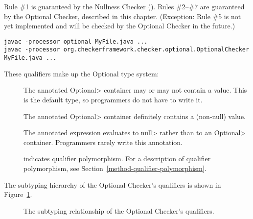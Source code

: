 Rule \#1 is guaranteed by the Nullness Checker
().
Rules \#2--\#7 are guaranteed by the Optional Checker, described in this chapter.
(Exception:  Rule \#5 is not yet implemented and will be checked by the
Optional Checker in the future.)



\begin{Verbatim}
javac -processor optional MyFile.java ...
javac -processor org.checkerframework.checker.optional.OptionalChecker MyFile.java ...
\end{Verbatim}



These qualifiers make up the Optional type system:

\begin{description}

\item[]
  The annotated \<Optional> container may or may not contain a value.
  This is the default type, so programmers do not have to write it.

\item[]
  The annotated \<Optional> container definitely contains a (non-null) value.

\item[]
  The annotated expression evaluates to \<null> rather than to an \<Optional> container.
  Programmers rarely write this annotation.

\item[]
  indicates qualifier polymorphism.
  For a description of qualifier polymorphism, see
  Section~\ref{method-qualifier-polymorphism}.

\end{description}

The subtyping hierarchy of the Optional Checker's qualifiers is shown in
Figure~\ref{fig-optional-hierarchy}.

\begin{figure}
\caption{The subtyping relationship of the Optional Checker's qualifiers.}
\label{fig-optional-hierarchy}
\end{figure}


